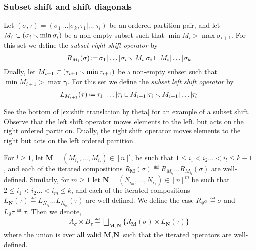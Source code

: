 
\subsubsection{Subset shift and shift diagonals}

\begin{definition} 
\label{def:subset shifts}
Let $(\sigma,\tau) = (\sigma_1|\dots|\sigma_k,\tau_1|\dots|\tau_l)$ be an ordered partition pair, and let $M_i\subset (\sigma_{i}\smallsetminus \min \sigma_{i})$ be a non-empty subset such that $\min M_i> \max \sigma_{i+1}$.
For this set we define the \emph{subset right shift operator} by
\begin{align*}
    R_{M_i}(\sigma) \eqdef  \sigma_1|\dots|\sigma_i \ssm M_i|\sigma_i \sqcup M_i|\dots|\sigma_k
\end{align*}
Dually, let $M_{i+1}\subset (\tau_{i+1}\smallsetminus \min \tau_{i+1})$  be a non-empty subset such that $\min M_{i+1}> \max \tau_{i}$.
For this set we define the \emph{subset left shift operator} by
\begin{align*}
    L_{M_{i+1}}(\tau) \eqdef  \tau_1|\dots|\tau_i \sqcup M_{i+1}|\tau_i \ssm M_{i+1}|\dots|\tau_l
\end{align*}
\end{definition}

See the bottom of \cref{ex:shift translation by theta} for an example of a subset shift.
Observe that the left shift operator moves elements to the left, but acts on the right ordered partition.
Dually, the right shift operator moves elements to the right but acts on the left ordered partition.

For $l\geq 1$, let $\textbf{M} = (M_{i_1},\dots,M_{i_l}) \in [n]^{l}$, be such that $1\leq i_1 < i_2 \dots < i_l\leq k-1$, and each of the iterated compositions $R_\mathbf{M}(\sigma)  \eqdef  R_{M_{i_l}}\dots R_{M_{i_1}}(\sigma)$ are well-defined.
Similarly, for $m\geq 1$ let $\textbf{N} = (N_{i_m},\dots,N_{i_1}) \in [n]^{m}$ be such that $2\leq i_1 < i_2 \dots < i_m\leq k$, and each of the iterated compositions  $L_\mathbf{N}(\tau)  \eqdef  L_{N_{i_1}}\dots L_{N_{i_m}}(\tau)$ are well-defined.
We define the case $R_{\emptyset}\sigma  \eqdef  \sigma$ and $L_{\emptyset}\tau  \eqdef  \tau$. Then we denote,
\begin{align*}
    A_{\sigma}\times B_\tau \eqdef  \bigsqcup_{\mathbf{M},\mathbf{N}} \{R_\mathbf{M}(\sigma)\times L_\mathbf{N}(\tau) \}
\end{align*}
where the union is over all valid $\textbf{M},\textbf{N}$ such that the iterated operators are well-defined.


